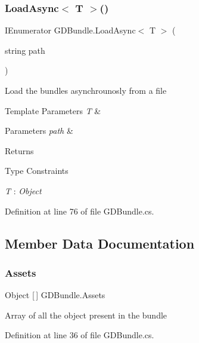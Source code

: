 \subsubsection{Load\+Async$<$ T $>$()}
{\footnotesize\ttfamily I\+Enumerator G\+D\+Bundle.\+Load\+Async$<$ T $>$ (\begin{DoxyParamCaption}\item[{string}]{path }\end{DoxyParamCaption})}



Load the bundles asynchrounosly from a file 


\begin{DoxyTemplParams}{Template Parameters}
{\em T} & \\
\hline
\end{DoxyTemplParams}

\begin{DoxyParams}{Parameters}
{\em path} & \\
\hline
\end{DoxyParams}
\begin{DoxyReturn}{Returns}

\end{DoxyReturn}
\begin{Desc}
\item[Type Constraints]\begin{description}
\item[{\em T} : {\em Object}]\end{description}
\end{Desc}


Definition at line 76 of file G\+D\+Bundle.\+cs.



\subsection{Member Data Documentation}
\mbox{\label{class_g_d_bundle_afab05f6b503a85ee5d752735419ad325}} 
\subsubsection{Assets}
{\footnotesize\ttfamily Object [$\,$] G\+D\+Bundle.\+Assets}



Array of all the object present in the bundle 



Definition at line 36 of file G\+D\+Bundle.\+cs.

